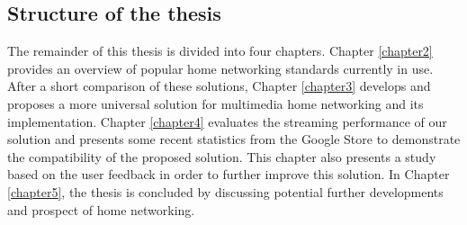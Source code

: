 \subsection{Structure of the thesis}
The remainder of this thesis is divided into four chapters. Chapter
\ref{chapter2} provides an overview of popular home networking standards
currently in use. After a short comparison of these solutions, Chapter
\ref{chapter3} develops and proposes a more universal solution for multimedia
home networking and its implementation.
Chapter \ref{chapter4} evaluates the streaming performance of our solution and
presents some recent statistics from the Google Store to demonstrate the
compatibility of the proposed solution. This chapter also presents a study
based on the user feedback in order to further improve this solution. In
Chapter \ref{chapter5}, the thesis is concluded by  discussing potential 
further developments and prospect of home networking.
